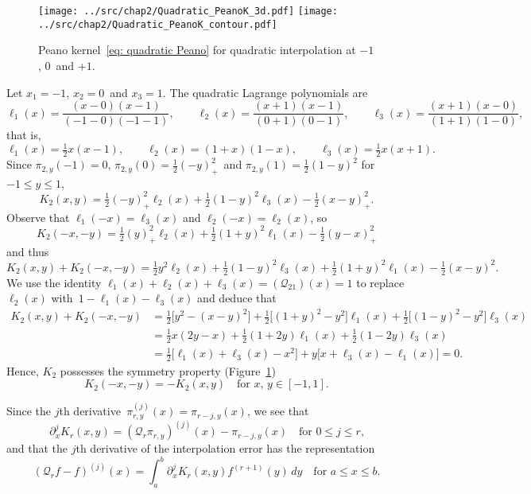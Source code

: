 \begin{figure}
\caption{Peano kernel~\eqref{eq: quadratic Peano} for quadratic interpolation 
at $-1$, $0$~and $+1$.}\label{fig: quadratic Peano}
\begin{center}
\texttt{[image: ../src/chap2/Quadratic\_PeanoK\_3d.pdf]}
\texttt{[image: ../src/chap2/Quadratic\_PeanoK\_contour.pdf]}
\end{center}
\end{figure}

\begin{example}\label{example: quadratic interp}
Let $x_1=-1$, $x_2=0$~and $x_3=1$.  The quadratic Lagrange polynomials are
\[
\ell_1(x)=\frac{(x-0)(x-1)}{(-1-0)(-1-1)},\qquad
\ell_2(x)=\frac{(x+1)(x-1)}{(0+1)(0-1)},\qquad
\ell_3(x)=\frac{(x+1)(x-0)}{(1+1)(1-0)},
\]
that is,
\[
\ell_1(x)=\tfrac12x(x-1),\qquad
\ell_2(x)=(1+x)(1-x),\qquad
\ell_3(x)=\tfrac12x(x+1).
\]
Since $\pi_{2,y}(-1)=0$, $\pi_{2,y}(0)=\tfrac12(-y)_+^2$~and 
$\pi_{2,y}(1)=\tfrac12(1-y)^2$ for~$-1\le y\le 1$,
\begin{equation}\label{eq: quadratic Peano}
K_2(x,y)=\tfrac12(-y)_+^2\ell_2(x)+\tfrac12(1-y)^2\ell_3(x)-\tfrac12(x-y)_+^2.
\end{equation}
Observe that $\ell_1(-x)=\ell_3(x)$ and $\ell_2(-x)=\ell_2(x)$, so
\[
K_2(-x,-y)=\tfrac12(y)_+^2\ell_2(x)+\tfrac12(1+y)^2\ell_1(x)-\tfrac12(y-x)_+^2
\]
and thus
\[
K_2(x,y)+K_2(-x,-y)=\tfrac12y^2\ell_2(x)+\tfrac12(1-y)^2\ell_3(x)
	+\tfrac12(1+y)^2\ell_1(x)-\tfrac12(x-y)^2.
\]
We use the identity $\ell_1(x)+\ell_2(x)+\ell_3(x)=(\mathcal{Q}_21)(x)=1$ to
replace $\ell_2(x)$ with~$1-\ell_1(x)-\ell_3(x)$ and deduce that
\begin{align*}
K_2(x,y)+K_2(-x,-y)&=\tfrac12\bigl[y^2-(x-y)^2\bigr]
	+\tfrac12\bigl[(1+y)^2-y^2\bigr]\ell_1(x)
	+\tfrac12\bigl[(1-y)^2-y^2\bigr]\ell_3(x)\\
	&=\tfrac12x(2y-x)+\tfrac12(1+2y)\ell_1(x)+\tfrac12(1-2y)\ell_3(x)\\
	&=\tfrac12\bigl[\ell_1(x)+\ell_3(x)-x^2\bigr]
	+y\bigl[x+\ell_3(x)-\ell_1(x)\bigr]=0.
\end{align*}
Hence, $K_2$ possesses the symmetry property (Figure~\ref{fig: quadratic Peano})
\begin{equation}\label{eq: K2 symmetry}
K_2(-x,-y)=-K_2(x,y)\quad\text{for $x$, $y\in[-1,1]$.}
\end{equation}
\end{example}

Since the $j$th derivative~$\pi_{r,y}^{(j)}(x)=\pi_{r-j,y}(x)$, we see that
\[
\partial_x^jK_r(x,y)=(\mathcal{Q}_r\pi_{r,y})^{(j)}(x)-\pi_{r-j,y}(x)
\quad\text{for $0\le j\le r$,}
\]
and that the $j$th derivative of the interpolation error has the representation
\begin{equation}\label{eq: Qr f error deriv}
(\mathcal{Q}_rf-f)^{(j)}(x)=\int_a^b\partial_x^j K_r(x,y)f^{(r+1)}(y)\,dy
\quad\text{for $a\le x\le b$.}
\end{equation}


